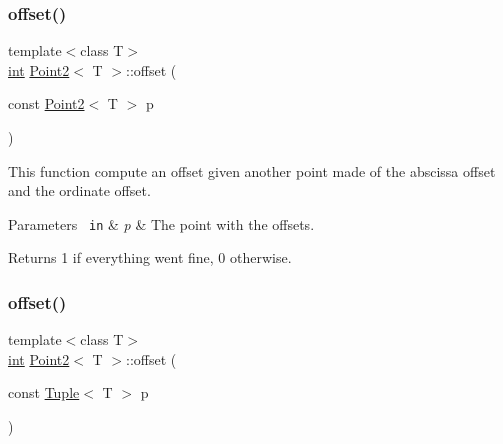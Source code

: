 \subsubsection{\texorpdfstring{offset()}{offset()}\hspace{0.1cm}{\footnotesize\ttfamily [2/3]}}
{\footnotesize\ttfamily template$<$class T$>$ \\
\mbox{\hyperlink{draw_8hh_aa620a13339ac3a1177c86edc549fda9b}{int}} \mbox{\hyperlink{class_point2}{Point2}}$<$ T $>$\+::offset (\begin{DoxyParamCaption}\item[{const \mbox{\hyperlink{class_point2}{Point2}}$<$ T $>$}]{p }\end{DoxyParamCaption})\hspace{0.3cm}{\ttfamily [inline]}}



This function compute an offset given another point made of the abscissa offset and the ordinate offset. 


\begin{DoxyParams}[1]{Parameters}
\mbox{\texttt{ in}}  & {\em p} & The point with the offsets. \\
\hline
\end{DoxyParams}
\begin{DoxyReturn}{Returns}
1 if everything went fine, 0 otherwise. 
\end{DoxyReturn}
\mbox{\label{class_point2_af25c5bac4c7273d5af0488d7f1196be5}} 
\subsubsection{\texorpdfstring{offset()}{offset()}\hspace{0.1cm}{\footnotesize\ttfamily [3/3]}}
{\footnotesize\ttfamily template$<$class T$>$ \\
\mbox{\hyperlink{draw_8hh_aa620a13339ac3a1177c86edc549fda9b}{int}} \mbox{\hyperlink{class_point2}{Point2}}$<$ T $>$\+::offset (\begin{DoxyParamCaption}\item[{const \mbox{\hyperlink{class_tuple}{Tuple}}$<$ T $>$}]{p }\end{DoxyParamCaption})\hspace{0.3cm}{\ttfamily [inline]}}



